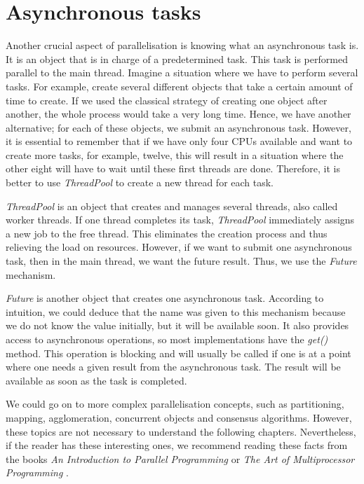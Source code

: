 \section{Asynchronous tasks}
\label{04:asynctaks}

Another crucial aspect of parallelisation is knowing what an asynchronous task is.
It is an object that is in charge of a predetermined task.
This task is performed parallel to the main thread.
Imagine a situation where we have to perform several tasks.
For example, create several different objects that take a certain amount of time to create.
If we used the classical strategy of creating one object after another, the whole process would take a very long time.
Hence, we have another alternative;
for each of these objects, we submit an asynchronous task.
However, it is essential to remember that if we have only four CPUs available and want to create more tasks, for example, twelve, this will result in a situation where the other eight will have to wait until these first threads are done.
Therefore, it is better to use \emph{ThreadPool} to create a new thread for each task.

\emph{ThreadPool} is an object that creates and manages several threads, also called worker threads.
If one thread completes its task, \emph{ThreadPool} immediately assigns a new job to the free thread.
This eliminates the creation process and thus relieving the load on resources.
However, if we want to submit one asynchronous task, then in the main thread, we want the future result.
Thus, we use the \emph{Future} mechanism.

\emph{Future} is another object that creates one asynchronous task.
According to intuition, we could deduce that the name was given to this mechanism because we do not know the value initially, but it will be available soon.
It also provides access to asynchronous operations, so most implementations have the \emph{get()} method.
This operation is blocking and will usually be called if one is at a point where one needs a given result from the asynchronous task.
The result will be available as soon as the task is completed.

We could go on to more complex parallelisation concepts, such as partitioning, mapping, agglomeration, concurrent objects and consensus algorithms.
However, these topics are not necessary to understand the following chapters.
Nevertheless, if the reader has these interesting ones, we recommend reading these facts from the books \emph{An Introduction to Parallel Programming} \cite{introductionToParallelProgramming} or \emph{The Art of Multiprocessor Programming} \cite{artOfMultiprocessorProgramming}.